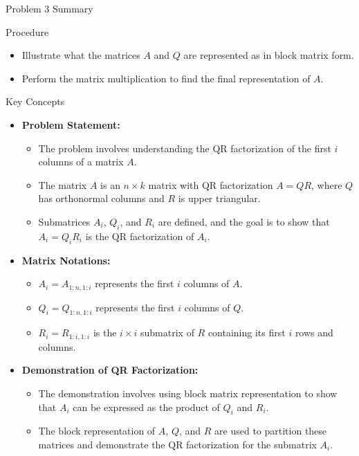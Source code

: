 \begin{summary}{Problem 3 Summary}
    \begin{statement}{Procedure}
        \begin{itemize}
            \item Illustrate what the matrices $A$ and $Q$ are represented as in block matrix form.
            \item Perform the matrix multiplication to find the final representation of $A$.
        \end{itemize}
    \end{statement}
    \begin{statement}{Key Concepts}
        \begin{itemize}
            \item \textbf{Problem Statement:}
            \begin{itemize}
                \item The problem involves understanding the QR factorization of the first $i$ columns of a matrix $A$.
                \item The matrix $A$ is an $n \times k$ matrix with QR factorization $A = QR$, where $Q$ has orthonormal columns and $R$ is upper triangular.
                \item Submatrices $A_i$, $Q_i$, and $R_i$ are defined, and the goal is to show that $A_i = Q_i R_i$ is the QR factorization of $A_i$.
            \end{itemize}
            \item \textbf{Matrix Notations:}
            \begin{itemize}
                \item $A_i = A_{1:n,1:i}$ represents the first $i$ columns of $A$.
                \item $Q_i = Q_{1:n,1:i}$ represents the first $i$ columns of $Q$.
                \item $R_i = R_{1:i,1:i}$ is the $i \times i$ submatrix of $R$ containing its first $i$ rows and columns.
            \end{itemize}
            \item \textbf{Demonstration of QR Factorization:}
            \begin{itemize}
                \item The demonstration involves using block matrix representation to show that $A_i$ can be expressed as the product of $Q_i$ and $R_i$.
                \item The block representation of $A$, $Q$, and $R$ are used to partition these matrices and demonstrate the QR factorization for the submatrix $A_i$.

\end{itemize}
\end{itemize}
\end{statement}
\end{summary}

